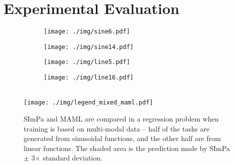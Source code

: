 \section{Experimental Evaluation}
\label{sec:experiments}
    \begin{figure*}[t]
		\centering
		\begin{subfigure}[t]{0.24\linewidth}
			\centering
			\texttt{[image: ./img/sine6.pdf]}
		\end{subfigure}
		\begin{subfigure}[t]{0.24\linewidth}
			\centering
			\texttt{[image: ./img/sine14.pdf]}
		\end{subfigure}
		\begin{subfigure}[t]{0.24\linewidth}
			\centering
			\texttt{[image: ./img/line5.pdf]}
		\end{subfigure}
		\begin{subfigure}[t]{0.24\linewidth}
			\centering
			\texttt{[image: ./img/line16.pdf]}
		\end{subfigure}
		\\
		\texttt{[image: ./img/legend\_mixed\_maml.pdf]}
		\caption{SImPa and MAML are compared in a regression problem when training is based on multi-modal data -- half of the tasks are generated from sinusoidal functions, and the other half are from linear functions. The shaded area is the prediction made by SImPa \(\pm\) 3\(\times\) standard deviation.}
		\label{fig:regression_visualisation}
	\end{figure*}
        
